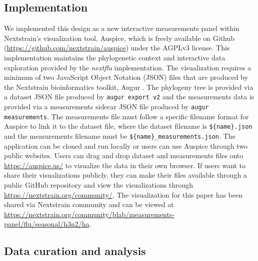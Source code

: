 \documentclass[utf8]{FrontiersinHarvard} %
\begin{document}
\subsection{Implementation}

We implemented this design as a new interactive measurements panel within Nextstrain's visualization tool, Auspice, which is freely available on Github (\url{https://github.com/nextstrain/auspice}) under the AGPLv3 license.
This implementation maintains the phylogenetic context and interactive data exploration provided by the \emph{nextflu} implementation.
The visualization requires a minimum of two JavaScript Object Notation (JSON) files that are produced by the Nextstrain bioinformatics toolkit, Augur \citep{Huddleston2021}.
The phylogeny tree is provided via a dataset JSON file produced by \texttt{augur export v2} and the measurements data is provided via a measurements sidecar JSON file produced by \texttt{augur measurements}.
The measurements file must follow a specific filename format for Auspice to link it to the dataset file, where the dataset filename is \texttt{\$\{name\}.json} and the measurements filename must be \texttt{\$\{name\}\_measurements.json}.
The application can be cloned and run locally or users can use Auspice through two public websites.
Users can drag and drop dataset and measurements files onto \url{https://auspice.us/} to visualize the data in their own browser.
If users want to share their visualizations publicly, they can make their files available through a public GitHub repository and view the visualizations through \url{https://nextstrain.org/community/}.
The visualization for this paper has been shared via Nextstrain community and can be viewed at \url{https://nextstrain.org/community/blab/measurements-panel/flu/seasonal/h3n2/ha}.

\subsection{Data curation and analysis}
\end{document}
